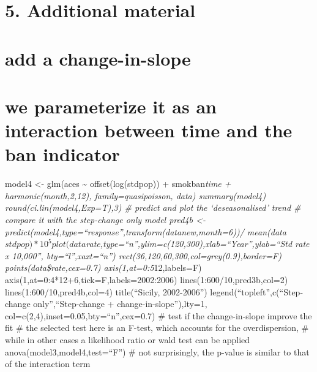 \documentclass[
]{article}
\begin{document}
\hypertarget{additional-material}{%
\section{5. Additional material}\label{additional-material}}

\hypertarget{add-a-change-in-slope}{%
\section{add a change-in-slope}\label{add-a-change-in-slope}}

\hypertarget{we-parameterize-it-as-an-interaction-between-time-and-the-ban-indicator}{%
\section{we parameterize it as an interaction between time and the ban
indicator}\label{we-parameterize-it-as-an-interaction-between-time-and-the-ban-indicator}}

model4 \textless- glm(aces \textasciitilde{} offset(log(stdpop)) +
smokban\emph{time + harmonic(month,2,12), family=quasipoisson, data)
summary(model4) round(ci.lin(model4,Exp=T),3) \# predict and plot the
`deseasonalised' trend \# compare it with the step-change only model
pred4b \textless-
predict(model4,type=``response'',transform(datanew,month=6))/
mean(data\(stdpop)*10^5 plot(data\)rate,type=``n'',ylim=c(120,300),xlab=``Year'',ylab=``Std
rate x 10,000'', bty=``l'',xaxt=``n'')
rect(36,120,60,300,col=grey(0.9),border=F) points(data\$rate,cex=0.7)
axis(1,at=0:5}12,labels=F) axis(1,at=0:4*12+6,tick=F,labels=2002:2006)
lines(1:600/10,pred3b,col=2) lines(1:600/10,pred4b,col=4)
title(``Sicily, 2002-2006'') legend(``topleft'',c(``Step-change
only'',``Step-change + change-in-slope''),lty=1,
col=c(2,4),inset=0.05,bty=``n'',cex=0.7) \# test if the change-in-slope
improve the fit \# the selected test here is an F-test, which accounts
for the overdispersion, \# while in other cases a likelihood ratio or
wald test can be applied anova(model3,model4,test=``F'') \# not
surprisingly, the p-value is similar to that of the interaction term
\end{document}
